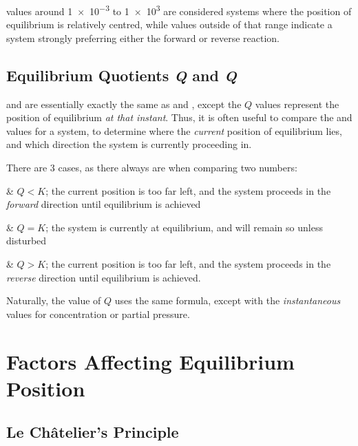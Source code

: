 			\Kc{} values around \num{1e-3} to \num{1e3} are considered systems where the position of equilibrium is relatively centred,
			while values outside of that range indicate a system strongly preferring either the forward or reverse reaction.



		\subsection{Equilibrium Quotients \textit{Q} and \textit{Q}}

			\Qc{} and \Qp{} are essentially exactly the same as \Kc{} and \Kp{}, except the $Q$ values represent the position of equilibrium
			\textit{at that instant}. Thus, it is often useful to compare the \Qc{} and \Kc{} values for a system, to determine
			where the \textit{current} position of equilibrium lies, and which direction the system is currently proceeding in.

			There are 3 cases, as there always are when comparing two numbers:

			\begin{bulletlist}
				& $Q < K$; the current position is too far left, and the system proceeds in the \textit{forward} direction until equilibrium
				is achieved

				& $Q = K$; the system is currently at equilibrium, and will remain so unless disturbed

				& $Q > K$; the current position is too far left, and the system proceeds in the \textit{reverse} direction until equilibrium
				is achieved.
			\end{bulletlist}

			Naturally, the value of $Q$ uses the same formula, except with the \textit{instantaneous} values for concentration or partial
			pressure.





	\pagebreak
	\section{Factors Affecting Equilibrium Position}

		\subsection{Le Châtelier's Principle}

